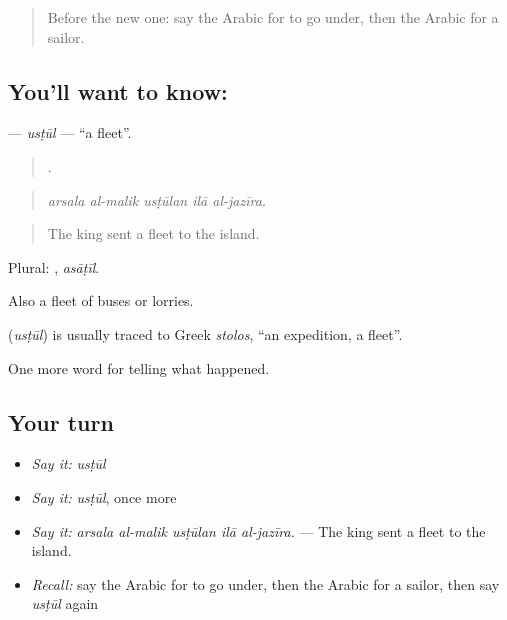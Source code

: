 \label{lesson:AR-C333-ustul}



\begin{quote}
Before the new one: say the Arabic for to go under, then the Arabic for a sailor.
\end{quote}

\subsection*{You'll want to know: }
\textbf{} — \emph{usṭūl} — \textquotedblleft{}a fleet\textquotedblright{}.

\begin{quote}
    .
\end{quote}

\begin{quote}
\emph{arsala al-malik usṭūlan ilā al-jazīra.}
\end{quote}

\begin{quote}
The king sent a fleet to the island.
\end{quote}

Plural: , \emph{asāṭīl}.

Also a fleet of buses or lorries.

\begin{cousinweb}
\textbf{} (\emph{usṭūl}) is usually traced to Greek \emph{stolos}, \textquotedblleft{}an expedition, a fleet\textquotedblright{}.
\end{cousinweb}

\begin{grammarlens}[title={What you've built}]
One more word for telling what happened.
\end{grammarlens}

\subsection*{Your turn}
\begin{itemize}
\raggedright
  \item \emph{Say it:} \emph{usṭūl}
  \item \emph{Say it:} \emph{usṭūl}, once more
  \item \emph{Say it:} \emph{arsala al-malik usṭūlan ilā al-jazīra.} — The king sent a fleet to the island.
  \item \emph{Recall:} say the Arabic for to go under, then the Arabic for a sailor, then say \emph{usṭūl} again
\end{itemize}

